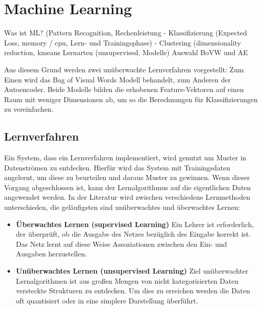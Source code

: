 \section{Machine Learning}

 \cite{aml2003}\newline

Was ist ML? (Pattern Recognition, Rechenleistung\newline
  - Klassifizierung (Expected Loss, memory / cpu, Lern- und Trainingsphase)\newline
  - Clustering (dimensionality reduction, kmeans\newline
Lernarten (unsupervised, Modelle)\newline
Auswahl BoVW und AE

Aus diesem Grund werden zwei unüberwachte Lernverfahren vorgestellt: 
Zum Einen wird das Bag of Visual Words Modell behandelt, zum Anderen der Autoencoder. Beide Modelle bilden die erhobenen Feature-Vektoren auf einen Raum mit weniger Dimensionen ab, um so die Berechnungen für Klassifizierungen zu vereinfachen.

\subsection{Lernverfahren}

Ein System, dass ein Lernverfahren implementiert, wird genutzt um Muster in Datenströmen zu entdecken. Hierfür wird das System mit Trainingsdaten angelernt, um diese zu beurteilen und daraus Muster zu gewinnen. Wenn dieser Vorgang abgeschlossen ist, kann der Lernalgorithmus auf die eigentlichen Daten angewendet werden. In der Literatur wird zwischen verschiedene Lernmethoden unterschieden, die geläufigsten sind unüberwachtes und überwachtes Lernen:

\begin{itemize}
	\item \textbf{Überwachtes Lernen (supervised Learning)} Ein Lehrer ist erforderlich, der überprüft, ob die Ausgabe des Netzes bezüglich des Eingabe korrekt ist. Das Netz lernt auf diese Weise Assoziationen zwischen den Ein- und Ausgaben herzustellen.
	\item \textbf{Unüberwachtes Lernen (unsupervised Learning)} Ziel unüberwachter Lernalgorithmen ist aus großen Mengen von nicht kategorisierten Daten versteckte Strukturen zu entdecken. Um dies zu erreichen werden die Daten oft quantisiert oder in eine simplere Darstellung überführt.
\end{itemize}

